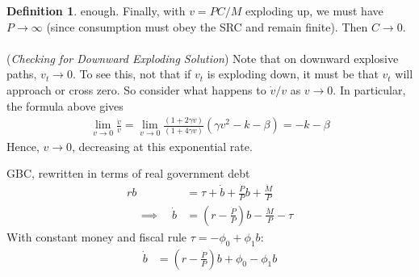 \documentclass[12pt]{article}
\theoremstyle{plain}
\theoremstyle{definition}
\newtheorem{defn}[thm]{Definition}
\theoremstyle{remark}
\newcommand{\ra}{\rightarrow}
\begin{document}
\begin{defn}
enough.
Finally, with $v=PC/M$ exploding up, we must have $P\ra \infty$ (since
consumption must obey the SRC and remain finite). Then $C\ra 0$.
\\
\\
(\emph{Checking for Downward Exploding Solution})
Note that on downward explosive paths, $v_t\ra 0$.
To see this, not that if $v_t$ is exploding down, it must be that $v_t$
will approach or cross zero. So consider what happens to $\dot{v}/v$ as
$v\ra 0$. In particular, the formula above gives
\begin{align*}
  \lim_{v\ra 0}
    \frac{\dot{v}}{v}
    =
  \lim_{v\ra 0}
    \frac{(1+2\gamma v)}{(1+4\gamma v)}
    (\gamma v^2 - k -\beta)
    =
    -k-\beta
\end{align*}
Hence, $v\ra 0$, decreasing at this exponential rate.


GBC, rewritten in terms of real government debt
\begin{align*}
  rb
  &=
  \tau
  +
  \dot{b}
  +
  \frac{\dot{P}}{P}
  b
  + \frac{\dot{M}}{P}
  \\
  \quad\implies\quad
  \dot{b}
  &=
  \left(
  r - \frac{\dot{P}}{P}
  \right)
  b
  - \frac{\dot{M}}{P}
  - \tau
\end{align*}
With constant money and fiscal rule $\tau=-\phi_0+\phi_1b$:
\begin{align*}
  \dot{b}
  &=
  \left(
  r - \frac{\dot{P}}{P}
  \right)
  b
  +\phi_0-\phi_1b
\end{align*}
\end{defn}
\end{document}
